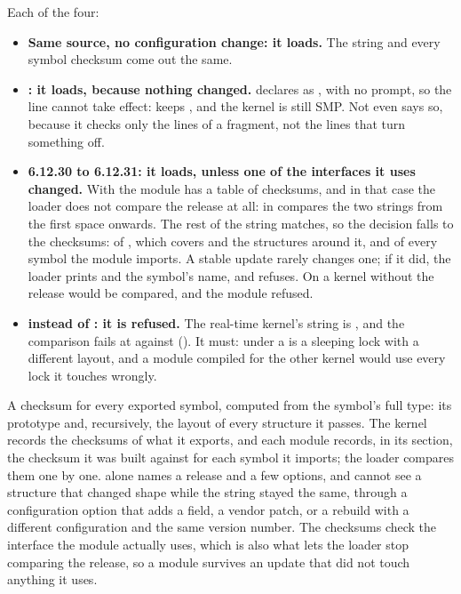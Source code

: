  Each of the four:
\begin{itemize}
  \item \textbf{Same source, no configuration change: it loads.} The  string and
    every symbol checksum come out the same.
  \item \textbf{: it loads, because nothing changed.}
     declares  as , with no prompt, so the line
    cannot take effect:  keeps , and the kernel is still SMP.
    Not even  says so, because it checks only the  lines of a
    fragment, not the lines that turn something off.
  \item \textbf{6.12.30 to 6.12.31: it loads, unless one of the interfaces it uses changed.} With
     the module has a table of checksums, and in that case the loader does not
    compare the release at all:  in  compares the
    two strings from the first space onwards. The rest of the string matches, so the decision falls
    to the checksums: of , which covers  and the structures
    around it, and of every symbol the module imports. A stable update rarely changes one; if it
    did, the loader prints  and the symbol's name,
    and refuses. On a kernel without  the release would be compared, and the
    module refused.
  \item \textbf{ instead of : it is refused.} The real-time kernel's
    string is , and the comparison
    fails at  against  (). It must: under
     a  is a sleeping lock with a different layout, and a module
    compiled for the other kernel would use every lock it touches wrongly.
\end{itemize}

 A checksum for every exported symbol, computed from the symbol's full type: its
prototype and, recursively, the layout of every structure it passes. The kernel records the
checksums of what it exports, and each module records, in its  section, the
checksum it was built against for each symbol it imports; the loader compares them one by one.
 alone names a release and a few options, and cannot see a structure that changed
shape while the string stayed the same, through a configuration option that adds a field, a vendor
patch, or a rebuild with a different configuration and the same version number. The checksums check
the interface the module actually uses, which is also what lets the loader stop comparing the
release, so a module survives an update that did not touch anything it uses.


